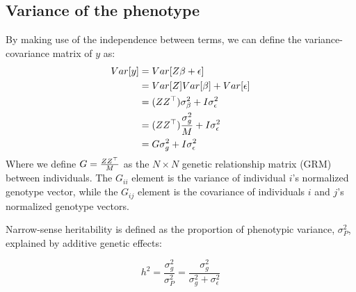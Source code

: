 \documentclass[12pt]{article}
\begin{document}
\subsection{Variance of the phenotype}
By making use of the independence between terms, we can define the variance-covariance matrix of $y$ as:
\begin{align*}
    Var[y] &= Var[Z \beta + \epsilon] \\
    &= Var[Z] Var[\beta] + Var[\epsilon] \\
    &= (Z Z^{\operatorname*{\top}}) \sigma_{\beta}^2 + I \sigma_{\epsilon}^2 \\
    &= (Z Z^{\operatorname*{\top}}) \frac{\sigma_{g}^2}{M} + I \sigma_{\epsilon}^2 \\
    &= G \sigma_{g}^2 + I \sigma_{\epsilon}^2 \\
\end{align*}
Where we define $G = \frac{Z Z^{\operatorname*{\top}}}{M}$ as the $N \times N$ genetic relationship matrix (GRM) between individuals. The $G_{ii}$ element is the variance of individual $i$'s normalized genotype vector, while the $G_{ij}$ element is the covariance of individuals $i$ and $j$'s normalized genotype vectors.

Narrow-sense heritability is defined as the proportion of phenotypic variance, $\sigma_P^2$, explained by additive genetic effects:

$$ h^2 = \frac{\sigma_{g}^2}{\sigma_P^2} = \frac{\sigma_{g}^2}{\sigma_{g}^2 + \sigma_{\epsilon}^2} $$
\end{document}
